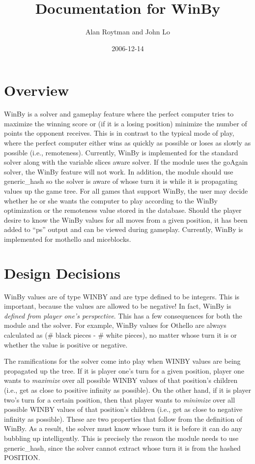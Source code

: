 \documentclass[pdftex]{article}
\begin{document}
\title{Documentation for WinBy}
\author{Alan Roytman and John Lo}
\date{2006-12-14}
\maketitle
\tableofcontents
\newpage

\section{Overview}

\indent \indent WinBy is a solver and gameplay feature where the perfect computer
tries to maximize the winning score or (if it is a losing position) minimize
the number of points the opponent receives.  This is in contrast to the typical
mode of play, where the perfect computer either wins as quickly as possible
or loses as slowly as possible (i.e., remoteness).  Currently, WinBy is implemented
for the standard solver along with the variable slices aware solver.  If
the module uses the goAgain solver, the WinBy feature will not work.  In addition,
the module should use generic\_hash so the solver is aware of whose turn it is
while it is propagating values up the game tree.  For all games that support
WinBy, the user may decide whether he or she wants the computer to play according
to the WinBy optimization or the remoteness value stored in the database.  Should
the player desire to know the WinBy values for all moves from a given position, it
has been added to ``ps'' output and can be viewed during gameplay.  Currently,
WinBy is implemented for mothello and miceblocks.

\section{Design Decisions}

\indent \indent WinBy values are of type WINBY and are type defined to be integers.
This is important, because the values are allowed to be negative!  In fact,
WinBy is \emph{defined from player one's perspective}.  This has a few consequences
for both the module and the solver.  For example, WinBy values for Othello are
always calculated as (\# black pieces - \# white pieces), no matter whose turn it
is or whether the value is positive or negative.

The ramifications for the solver come into play when WINBY values are being
propagated up the tree.  If it is player one's turn for a given position,
player one wants to \emph{maximize} over all possible WINBY values of that
position's children (i.e., get as close to positive infinity as possible).
On the other hand, if it is player two's turn for a certain
position, then that player wants to \emph{minimize} over all possible WINBY
values of that position's children (i.e., get as close to negative infinity
as possible).  These are two properties that follow from the definition of WinBy.
As a result, the solver must know whose turn it is before it can do any bubbling
up intelligently.  This is precisely the reason the module needs to use generic\_hash,
since the solver cannot extract whose turn it is from the hashed POSITION.
\end{document}
